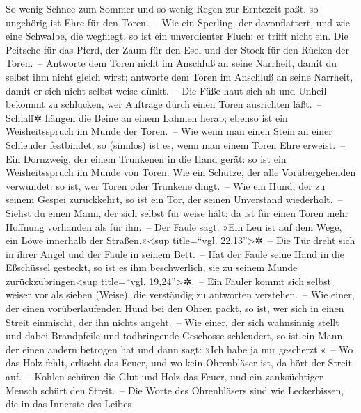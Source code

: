 So wenig Schnee zum Sommer und so wenig Regen zur
Erntezeit paßt, so ungehörig ist Ehre für den Toren.~--
Wie ein Sperling, der davonflattert, und wie eine
Schwalbe, die wegfliegt, so ist ein unverdienter Fluch: er trifft nicht
ein. Die Peitsche für das Pferd, der Zaum für den Esel und
der Stock für den Rücken der Toren.~-- Antworte dem Toren
nicht im Anschluß an seine Narrheit, damit du selbst ihm nicht gleich
wirst; antworte dem Toren im Anschluß an seine Narrheit,
damit er sich nicht selbst weise dünkt.~-- Die Füße haut
sich ab und Unheil bekommt zu schlucken, wer Aufträge durch einen Toren
ausrichten läßt.~-- Schlaff✲ hängen die Beine an einem
Lahmen herab; ebenso ist ein Weisheitsspruch im Munde der Toren.~--
Wie wenn man einen Stein an einer Schleuder festbindet, so
(sinnlos) ist es, wenn man einem Toren Ehre erweist.~--
Ein Dornzweig, der einem Trunkenen in die Hand gerät: so
ist ein Weisheitsspruch im Munde von Toren. Wie ein
Schütze, der alle Vorübergehenden verwundet: so ist, wer Toren oder
Trunkene dingt.~-- Wie ein Hund, der zu seinem Gespei
zurückkehrt, so ist ein Tor, der seinen Unverstand wiederholt.~--
Siehst du einen Mann, der sich selbst für weise hält: da
ist für einen Toren mehr Hoffnung vorhanden als für ihn.~--
Der Faule sagt: »Ein Leu ist auf dem Wege, ein Löwe
innerhalb der Straßen.«\textless sup title=``vgl.
22,13''\textgreater✲~-- Die Tür dreht sich in ihrer Angel
und der Faule in seinem Bett.~-- Hat der Faule seine Hand
in die Eßschüssel gesteckt, so ist es ihm beschwerlich, sie zu seinem
Munde zurückzubringen\textless sup title=``vgl. 19,24''\textgreater✲.~--
Ein Fauler kommt sich selbst weiser vor als sieben
(Weise), die verständig zu antworten verstehen.~-- Wie
einer, der einen vorüberlaufenden Hund bei den Ohren packt, so ist, wer
sich in einen Streit einmischt, der ihn nichts angeht.~--
Wie einer, der sich wahnsinnig stellt und dabei
Brandpfeile und todbringende Geschosse schleudert, so ist
ein Mann, der einen andern betrogen hat und dann sagt: »Ich habe ja nur
gescherzt.«~-- Wo das Holz fehlt, erlischt das Feuer, und
wo kein Ohrenbläser ist, da hört der Streit auf.~--
Kohlen schüren die Glut und Holz das Feuer, und ein
zanksüchtiger Mensch schürt den Streit.~-- Die Worte des
Ohrenbläsers sind wie Leckerbissen, die in das Innerste des Leibes
